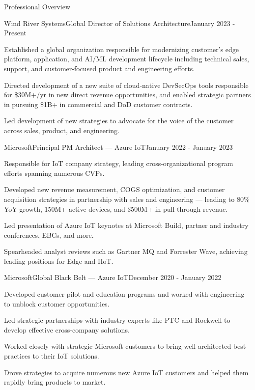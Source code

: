 \documentclass{resume} %
\begin{document}
\begin{rSection}{Professional Overview}
  
  \begin{rNewRole}{Wind River Systems}{Global Director of Solutions Architecture}{January 2023 - Present}
    \item Established a global organization responsible for modernizing customer's edge platform, application, and AI/ML development lifecycle including technical sales, support, and customer-focused product and engineering efforts.
    \item Directed development of a new suite of cloud-native DevSecOps tools responsible for \$30M+/yr in new direct revenue opportunities, and enabled strategic partners in pursuing \$1B+ in commercial and DoD customer contracts.
    \item Led development of new strategies to advocate for the voice of the customer across sales, product, and engineering.
  \end{rNewRole}

  \begin{rNewRole}{Microsoft}{Principal PM Architect --- Azure IoT}{January 2022 - January 2023}
      
    \item Responsible for IoT company strategy, leading cross-organizational program efforts spanning numerous CVPs.
    \item Developed new revenue measurement, COGS optimization, and customer acquisition strategies in partnership with sales and engineering --- leading to 80\% YoY growth, 150M+ active devices, and \$500M+ in pull-through revenue.
    \item Led presentation of Azure IoT keynotes at Microsoft Build, partner and industry conferences, EBCs, and more.
    \item Spearheaded analyst reviews such as Gartner MQ and Forrester Wave, achieving leading positions for Edge and IIoT.
    
  \end{rNewRole}

  \begin{rNewRole}{Microsoft}{Global Black Belt --- Azure IoT}{December 2020 - January 2022}
      
    \item Developed customer pilot and education programs and worked with engineering to unblock customer opportunities.
    \item Led strategic partnerships with industry experts like PTC and Rockwell to develop effective cross-company solutions.
    \item Worked closely with strategic Microsoft customers to bring well-architected best practices to their IoT solutions.
    \item Drove strategies to acquire numerous new Azure IoT customers and helped them rapidly bring products to market.
    

\end{rNewRole}
\end{rSection}
\end{document}
